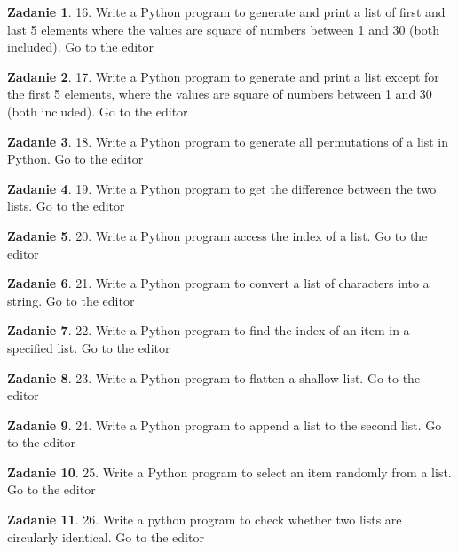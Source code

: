 \documentclass[11pt]{article}
\theoremstyle{definition}
\newtheorem{zadanie}{Zadanie}
\begin{document}
\begin{zadanie}
16. Write a Python program to generate and print a list of first and last 5 elements where the values are square of numbers between 1 and 30 (both included). Go to the editor
\end{zadanie}

\begin{zadanie}
17. Write a Python program to generate and print a list except for the first 5 elements, where the values are square of numbers between 1 and 30 (both included). Go to the editor
\end{zadanie}

\begin{zadanie}
18. Write a Python program to generate all permutations of a list in Python. Go to the editor
\end{zadanie}

\begin{zadanie}
19. Write a Python program to get the difference between the two lists. Go to the editor
\end{zadanie}

\begin{zadanie}
20. Write a Python program access the index of a list. Go to the editor
\end{zadanie}

\begin{zadanie}
21. Write a Python program to convert a list of characters into a string. Go to the editor
\end{zadanie}

\begin{zadanie}
22. Write a Python program to find the index of an item in a specified list. Go to the editor
\end{zadanie}

\begin{zadanie}
23. Write a Python program to flatten a shallow list. Go to the editor
\end{zadanie}

\begin{zadanie}
24. Write a Python program to append a list to the second list. Go to the editor
\end{zadanie}

\begin{zadanie}
25. Write a Python program to select an item randomly from a list. Go to the editor
\end{zadanie}

\begin{zadanie}
26. Write a python program to check whether two lists are circularly identical. Go to the editor
\end{zadanie}
\end{document}
